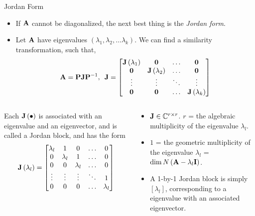 \documentclass[aspectratio=169]{beamer}
\def\mf{\ensuremath\mathbf}
\def\mb{\ensuremath\mathbb}
\begin{document}
\begin{frame}[t]{Jordan Form}
\begin{itemize}
    \item If $\mf{A}$ cannot be diagonalized, the next best thing is the \textit{Jordan form}.

    \item Let $\mf{A}$ have eigenvalues $\left(\lambda_1, \lambda_2, \ldots \lambda_k\right)$. We can find a similarity transformation, such that,
    \[ \mf{A} = \mf{P}\mf{J}\mf{P}^{-1}, \,\,\, \mf{J} = \begin{bmatrix*}
    \mf{J}\left(\lambda_1\right) & \mf{0} & \ldots & \mf{0}\\
    \mf{0} & \mf{J}\left(\lambda_2\right) & \ldots & \mf{0}\\
    \vdots & \vdots & \ddots & \vdots\\
    \mf{0} & \mf{0} & \ldots & \mf{J}\left(\lambda_k\right)\\
    \end{bmatrix*} \]
\end{itemize}
\begin{columns}
\begin{column}{0.5\textwidth}
\begin{footnotesize}
Each $\mf{J}\left(\bullet\right)$ is associated with an eigenvalue and an eigenvector, and  is called a Jordan block, and has the form
\[ \mf{J}\left(\lambda_l\right) = \begin{bmatrix*}
\lambda_l & 1 & 0 & \ldots & 0 \\
0 & \lambda_l & 1 & \ldots & 0 \\
0 & 0 & \lambda_l & \ldots & 0 \\
\vdots & \vdots & \vdots & \ddots & 1 \\
0 & 0 & 0 & \ldots & \lambda_l \\
\end{bmatrix*} \]
\end{footnotesize}
\end{column}
\begin{column}{0.5\textwidth}
\begin{footnotesize}
\begin{itemize}
    \item $\mf{J} \in \mb{C}^{r \times r}$. $r$ = the algebraic multiplicity of the eigenvalue $\lambda_l$.
    \item $1$ = the geometric multiplicity of the eigenvalue $\lambda_l$ = $\dim N\left(\mf{A} - \lambda_l\mf{I}\right)$.
    \item A 1-by-1 Jordan block is simply $[\lambda_l]$, corresponding to a eigenvalue with an associated eigenvector.
\end{itemize}
\end{footnotesize}
\end{column}
\end{columns}
\end{frame}
\end{document}

